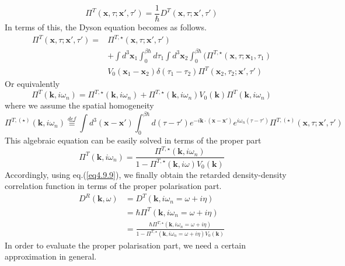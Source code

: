 \begin{equation}
\Pi^T(\mathbf x,\tau;\mathbf x',\tau')=\frac{1}{\hbar}D^T(\mathbf x,\tau;\mathbf x',\tau')
\end{equation} 
 In terms of this, the Dyson equation becomes as follows.
\begin{equation}
\begin{aligned}
\Pi^{T}(\mathbf x,\tau;\mathbf x',\tau')=&\Pi^{T,\star}(\mathbf x,\tau;\mathbf x',\tau')\\
&+\int d^3\mathbf x_1 \int_0^{\beta\hbar}d\tau_1\int d^3\mathbf x_2\int _0^{\beta\hbar}(\Pi^{T,\star}(\mathbf x,\tau;\mathbf x_1,\tau_1)\\
&V_0(\mathbf x_1-\mathbf x_2)\delta(\tau_1-\tau_2)\Pi^T(\mathbf x_2,\tau_2;\mathbf x',\tau')
\end{aligned}
\end{equation}
 Or equivalently
\begin{equation}
\Pi^T(\mathbf k,i\omega_n)=\Pi^{T,\star}(\mathbf k,i\omega_n)+\Pi^{T,\star}(\mathbf k,i\omega_n)V_0(\mathbf k)\Pi^T(\mathbf k,i\omega_n)
\end{equation}
 where we assume the spatial homogeneity
\begin{equation}
\Pi^{T,(\star)}(\mathbf k,i\omega_n)\overset{def}{\equiv}\int d^3(\mathbf x-\mathbf x')\int_0^{\beta\hbar} d(\tau-\tau') e^{-i\mathbf k\cdot(\mathbf x-\mathbf x')} e^{i\omega_n(\tau-\tau')} \Pi^{T,(\star)}(\mathbf x,\tau;\mathbf x',\tau')
\end{equation}
 This algebraic equation can be easily solved in terms of the proper part
\begin{equation}
\Pi^T(\mathbf k,i\omega_n)=\frac{\Pi^{T,\star}(\mathbf k,i\omega_n)}{1-\Pi^{T,\star}(\mathbf k,i\omega)V_0(\mathbf k)}
\end{equation}
 Accordingly, using eq.(\ref{eq4.9.9}), we finally obtain the retarded density-density correlation function in terms of the proper polarisation part.
\begin{equation}
\begin{aligned}
D^R(\mathbf k,\omega)&=D^T(\mathbf k,i\omega_n=\omega+i\eta)\\
&=\hbar \Pi^T(\mathbf k,i\omega_n=\omega+i\eta)\\
&=\frac{\hbar \Pi^{T,\star}(\mathbf k,i\omega_n=\omega+i\eta)}{1-\Pi^{T,\star}(\mathbf k,i\omega_n=\omega+i\eta)V_0(\mathbf k)}
\end{aligned}
\end{equation}
In order to evaluate the proper polarisation part, we need a certain approximation in general.\\
